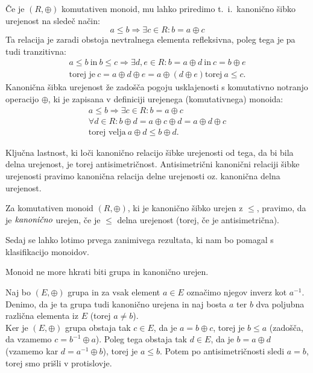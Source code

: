 \documentclass[mat1]{fmfdelo}
\newcommand{\pojem}[1]{\ensuremath{\emph{#1}}}
\begin{document}
\begin{opomba}
	\label{opomb:kanonšibrel}
	Če je $(R, \oplus)$ komutativen monoid, mu lahko priredimo t.~i.~kanonično šibko urejenost na sledeč način: $$a \leq b \Rightarrow \exists c\in R: b = a \oplus c$$ Ta relacija je zaradi obstoja nevtralnega elementa refleksivna, poleg tega je pa tudi tranzitivna: \begin{align*}
		a\leq b~\text{in}~b\leq c \Rightarrow \exists d, e\in R: b = a \oplus d~\text{in}~ c = b \oplus e \\
		\text{torej je}~ c = a \oplus d \oplus e = a \oplus (d \oplus e) \text{torej}~ a \leq c.
	\end{align*}
	Kanonična šibka urejenost že zadošča pogoju usklajenosti s komutativno notranjo operacijo $\oplus$, ki je zapisana v definiciji urejenega (komutativnega) monoida: \begin{align*}
		a \leq b \Rightarrow \exists c\in R: b = a \oplus c \\
		\forall d \in R: b \oplus d = a \oplus c \oplus d = a \oplus d \oplus c \\
		\text{torej velja}~ a \oplus d \leq b \oplus d.
	\end{align*}
	
	Ključna lastnost, ki loči kanonično relacijo šibke urejenosti od tega, da bi bila delna urejenost, je torej antisimetričnost. Antisimetrični kanonični relaciji šibke urejenosti pravimo kanonična relacija delne urejenosti oz. kanonična delna urejenost.
\end{opomba}
\begin{definicija}
		Za komutativen monoid $(R, \oplus)$, ki je kanonično šibko urejen z $\leq$, pravimo, da je \pojem{kanonično} urejen, če je $\leq$ delna urejenost (torej, če je antisimetrična).
\end{definicija}
Sedaj se lahko lotimo prvega zanimivega rezultata, ki nam bo pomagal s klasifikacijo monoidov.

\begin{izrek}
	\label{izr:kdunegrp}
	Monoid ne more hkrati biti grupa in kanonično urejen.
\end{izrek}
\begin{dokaz}
	Naj bo $(E, \oplus)$ grupa in za vsak element $a\in E$ označimo njegov inverz kot $a^{-1}$. Denimo, da je ta grupa tudi kanonično urejena in naj bosta $a$ ter $b$ dva poljubna različna elementa iz $E$ (torej $a\neq b$). \\
	Ker je $(E, \oplus)$ grupa obstaja tak $c\in E$, da je $a = b \oplus c$, torej je $b \leq a$ (zadošča, da vzamemo $c = b^{-1}\oplus a$). Poleg tega obstaja tak $d\in E$, da je $b = a \oplus d$ (vzamemo kar $d = a^{-1}\oplus b$), torej je $a \leq b$. Potem po antisimetričnosti sledi $a = b$, torej smo prišli v protislovje.
\end{dokaz}
\end{document}
